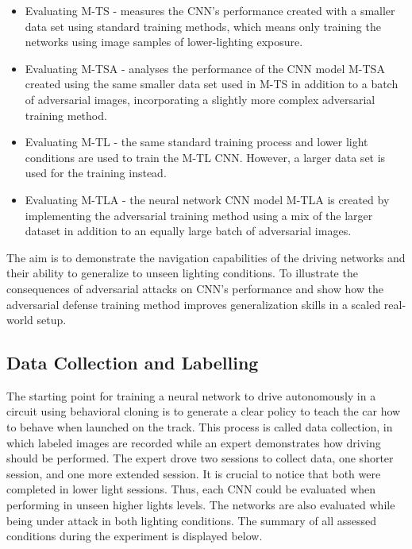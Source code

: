 \documentclass[12pt]{article}
\begin{document}
\begin{itemize}

   \item Evaluating M-TS - measures the CNN's performance created with a smaller data set using standard training methods, which means only training the networks using image samples of lower-lighting exposure.
   
    \item Evaluating M-TSA - analyses the performance of the CNN model M-TSA created using the same smaller data set used in M-TS in addition to a batch of adversarial images, incorporating a slightly more complex adversarial training method.
   
   \item Evaluating M-TL - the same standard training process and lower light conditions are used to train the M-TL CNN. However, a larger data set is used for the training instead. 
   
   \item Evaluating M-TLA - the neural network CNN model M-TLA is created by implementing the adversarial training method using a mix of the larger dataset in addition to an equally large batch of adversarial images.
\end{itemize}
 
The aim is to demonstrate the navigation capabilities of the driving networks and their ability to generalize to unseen lighting conditions. To illustrate the consequences of adversarial attacks on CNN's performance and show how the adversarial defense training method improves generalization skills in a scaled real-world setup.

\subsection{Data Collection and Labelling}

The starting point for training a neural network to drive autonomously in a circuit using behavioral cloning is to generate a clear policy to teach the car how to behave when launched on the track. This process is called data collection, in which labeled images are recorded while an expert demonstrates how driving should be performed. The expert drove two sessions to collect data, one shorter session, and one more extended session. It is crucial to notice that both were completed in lower light sessions. Thus, each CNN could be evaluated when performing in unseen higher lights levels. The networks are also evaluated while being under attack in both lighting conditions. The summary of all assessed conditions during the experiment is displayed below.
\end{document}
